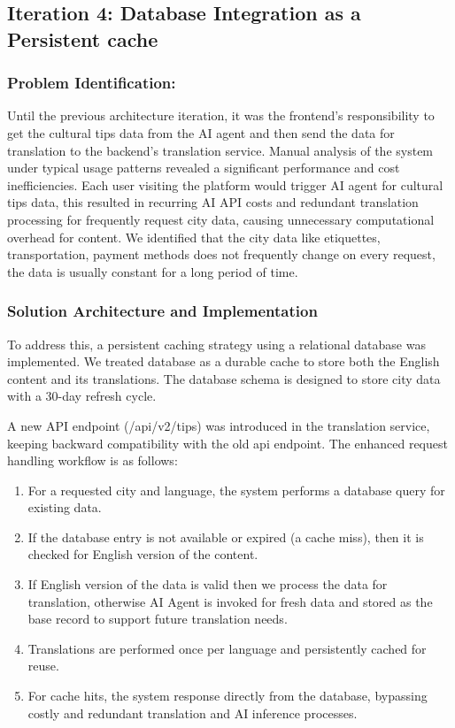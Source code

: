 \subsection{Iteration 4: Database Integration as a Persistent cache}

\subsubsection{Problem Identification:} 
Until the previous architecture iteration, it was the frontend's responsibility to get the cultural tips data from the AI agent and then send the data for translation to the backend's translation service. Manual analysis of the system under typical usage patterns revealed a significant performance and cost inefficiencies. Each user visiting the platform would trigger AI agent for cultural tips data, this resulted in recurring AI API costs and redundant translation processing for frequently request city data, causing unnecessary computational overhead for content. We identified that the city data like etiquettes, transportation, payment methods does not frequently change on every request, the data is usually constant for a long period of time\cite{govuk2020bus}\cite{bagheri2023global}\cite{zhang2021urban}\cite{tussey2025principles}.

\subsubsection{Solution Architecture and Implementation}

To address this, a persistent caching strategy using a relational database was implemented. We treated database as a durable cache to store both the English content and its translations. The database schema is designed to store city data with a 30-day refresh cycle. 

A new API endpoint (/api/v2/tips) was introduced in the translation service, keeping backward compatibility with the old api endpoint. The enhanced request handling workflow is as follows:
\begin{enumerate}
    \item For a requested city and language, the system performs a database query for existing data.
    \item If the database entry is not available or expired (a cache miss), then it is checked for English version of the content.
    \item If English version of the data is valid then we process the data for translation, otherwise AI Agent is invoked for fresh data and stored as the base record to support future translation needs.
    \item Translations are performed once per language and persistently cached for reuse.
    \item For cache hits, the system response directly from the database, bypassing costly and redundant translation and AI inference processes.
\end{enumerate}

